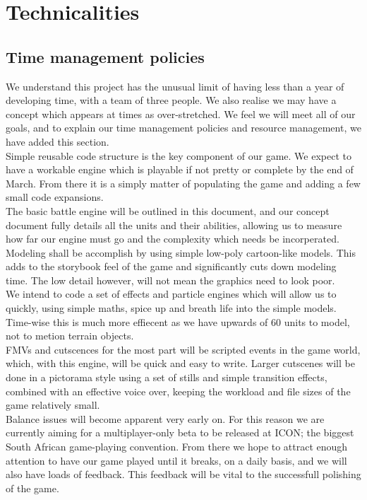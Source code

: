 \documentclass[a4paper,twocolumn]{article}
\begin{document}
\newpage \section{Technicalities}

\subsection{Time management policies}

We understand this project has the unusual limit of having less than a year of developing time, with a team of three people. We also realise we may have a concept which appears at times as over-stretched. We feel we will meet all of our goals, and to explain our time management policies and resource management, we have added this section.\\

Simple reusable code structure is the key component of our game. We expect to have a workable engine which is playable if not pretty or complete by the end of March. From there it is a simply matter of populating the game and adding a few small code expansions.\\
The basic battle engine will be outlined in this document, and our concept document fully details all the units and their abilities, allowing us to measure how far our engine must go and the complexity which needs be incorperated.\\

Modeling shall be accomplish by using simple low-poly cartoon-like models. This adds to the storybook feel of the game and significantly cuts down modeling time. The low detail however, will not mean the graphics need to look poor.\\
We intend to code a set of effects and particle engines which will allow us to quickly, using simple maths, spice up and breath life into the simple models. Time-wise this is much more effiecent as we have upwards of 60 units to model, not to metion terrain objects.\\

FMVs and cutscences for the most part will be scripted events in the game world, which, with this engine, will be quick and easy to write. Larger cutscenes will be done in a pictorama style using a set of stills and simple transition effects, combined with an effective voice over, keeping the workload and file sizes of the game relatively small.\\

Balance issues will become apparent very early on. For this reason we are currently aiming for a multiplayer-only beta to be released at ICON; the biggest South African game-playing convention. From there we hope to attract enough attention to have our game played until it breaks, on a daily basis, and we will also have loads of feedback. This feedback will be vital to the successfull polishing of the game.\\
\end{document}
